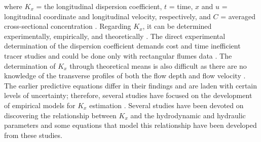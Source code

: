 \documentclass[a4paper,12pt, english]{article}
\begin{document}
where $K_x$ = the longitudinal dispersion coefficient, $t$ = time, $x$ and $u$ = longitudinal coordinate and longitudinal velocity, respectively, and $C$ = averaged cross-sectional concentration \cite{noori2011framework}. Regarding $K_x$, it can be determined experimentally, empirically, and theoretically \cite{perucca2009estimation, wang2016estimating, data2019estimation, milivsic2019estimation, deng2001longitudinal, deng2002longitudinal, seo2004estimation, shin2019longitudinal, seo1998predicting, swamee2000empirical, zeng2014estimation, disley2015predictive, camacho2019quantifying}. The direct experimental determination of the dispersion coefficient demands cost and time inefficient tracer studies and could be done only with rectangular flumes data \cite{etemad2012predicting}. The determination of $K_x$ through theoretical means is also difficult as there are no knowledge of the transverse profiles of both the flow depth and flow velocity \cite{deng2001longitudinal}. The earlier predictive equations differ in their findings and are laden with certain levels of uncertainty; therefore, several studies have focused on the development of empirical models for $K_x$ estimation \cite{wang2017physically, altunkaynak2016prediction,nezaratian2018sensitivity}. Several studies have been devoted on discovering the relationship between $K_x$ and the hydrodynamic and  hydraulic parameters \cite{sahin2014empirical, tutmez2013regression,shen2010estimating} and some equations that model this relationship have been developed from these studies.
\end{document}
